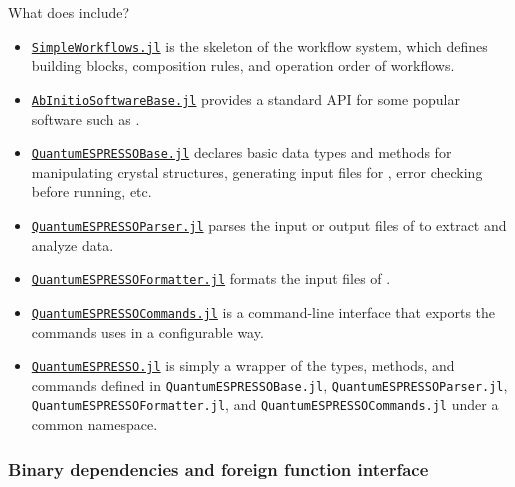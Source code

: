 \begin{frame}[allowframebreaks]{What does \express{} include?}
\begin{itemize}
              a database for storing and querying pseudopotentials used in \ab{} calculations.
        \item \href{https://github.com/MineralsCloud/SimpleWorkflows.jl}{\texttt{SimpleWorkflows.jl}}
              is the skeleton of the workflow system, which
              defines building blocks, composition rules, and operation order of workflows.
        \item \href{https://github.com/MineralsCloud/AbInitioSoftwareBase.jl}{\texttt{AbInitio\-Software\-Base.jl}}
              provides a standard API for some popular \ab{} software such as \qe.
        \item \href{https://github.com/MineralsCloud/QuantumESPRESSOBase.jl}{\texttt{Quantum\-ESPRESSO\-Base.jl}}
              declares basic data types and methods
              for manipulating crystal structures, generating input files for \qe,
              error checking before running, etc.
        \item \href{https://github.com/MineralsCloud/QuantumESPRESSOParser.jl}{\texttt{Quantum\-ESPRESSO\-Parser.jl}}
              parses the input or output files of \qe{} to extract and analyze data.
        \item \href{https://github.com/MineralsCloud/QuantumESPRESSOFormatter.jl}{\texttt{Quantum\-ESPRESSO\-Formatter.jl}}
              formats the input files of \qe.
        \item \href{https://github.com/MineralsCloud/QuantumESPRESSOCommands.jl}{\texttt{Quantum\-ESPRESSO\-Commands.jl}}
              is a command-line interface that exports the commands \qe{} uses in a configurable way.
        \item \href{https://github.com/MineralsCloud/QuantumESPRESSO.jl}{\texttt{QuantumESPRESSO.jl}}
              is simply a wrapper of the types, methods, and commands defined in
              \texttt{Quantum\-ESPRESSO\-Base.jl}, \texttt{Quantum\-ESPRESSO\-Parser.jl},
              \texttt{Quantum\-ESPRESSO\-Formatter.jl},
              and \texttt{Quantum\-ESPRESSO\-Commands.jl} under a common namespace.
    \end{itemize}

\end{frame}

\subsubsection{Binary dependencies and foreign function interface}

